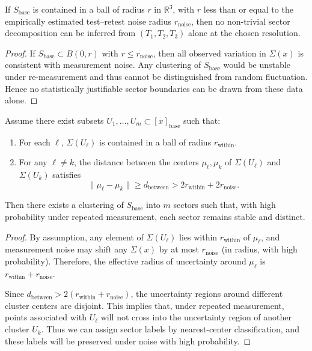 \documentclass[11pt]{article}
\begin{document}
\begin{proposition}
\label{prop:sector-nontrivial}
If $S_{\text{base}}$ is contained in a ball of radius $r$ in $\mathbb{R}^3$, with $r$ less than or equal to the empirically estimated test--retest noise radius $r_{\text{noise}}$, then no non-trivial sector decomposition can be inferred from $(T_1,T_2,T_3)$ alone at the chosen resolution.
\end{proposition}

\begin{proof}
If $S_{\text{base}} \subset B(0,r)$ with $r \le r_{\text{noise}}$, then all observed variation in $\Sigma(x)$ is consistent with measurement noise. Any clustering of $S_{\text{base}}$ would be unstable under re-measurement and thus cannot be distinguished from random fluctuation. Hence no statistically justifiable sector boundaries can be drawn from these data alone.
\end{proof}

\begin{theorem}
\label{thm:cluster-separation}
Assume there exist subsets $U_1,\dots,U_m \subset [x]_{\text{base}}$ such that:
\begin{enumerate}
  \item For each $\ell$, $\Sigma(U_\ell)$ is contained in a ball of radius $r_{\text{within}}$.
  \item For any $\ell \ne k$, the distance between the centers $\mu_\ell, \mu_k$ of $\Sigma(U_\ell)$ and $\Sigma(U_k)$ satisfies
  \[
    \|\mu_\ell - \mu_k\| \ge d_{\text{between}} > 2 r_{\text{within}} + 2 r_{\text{noise}}.
  \]
\end{enumerate}
Then there exists a clustering of $S_{\text{base}}$ into $m$ sectors such that, with high probability under repeated measurement, each sector remains stable and distinct.
\end{theorem}

\begin{proof}
By assumption, any element of $\Sigma(U_\ell)$ lies within $r_{\text{within}}$ of $\mu_\ell$, and measurement noise may shift any $\Sigma(x)$ by at most $r_{\text{noise}}$ (in radius, with high probability). Therefore, the effective radius of uncertainty around $\mu_\ell$ is $r_{\text{within}} + r_{\text{noise}}$.

Since $d_{\text{between}} > 2(r_{\text{within}}+r_{\text{noise}})$, the uncertainty regions around different cluster centers are disjoint. This implies that, under repeated measurement, points associated with $U_\ell$ will not cross into the uncertainty region of another cluster $U_k$. Thus we can assign sector labels by nearest-center classification, and these labels will be preserved under noise with high probability.
\end{proof}
\end{document}
